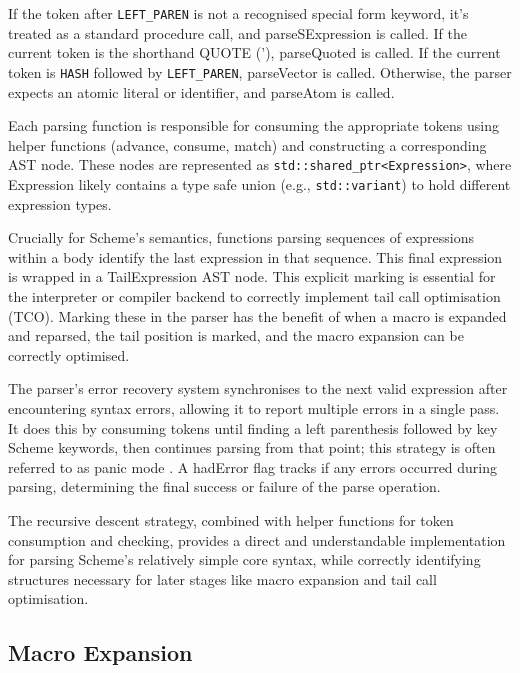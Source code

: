 \documentclass[final]{cmpreport_02}
\begin{document}
If the token after \texttt{LEFT\_PAREN} is not a recognised special form keyword, it's treated as a standard procedure call, and parseSExpression is called. If the current token is the shorthand QUOTE ('), parseQuoted is called. If the current token is \texttt{HASH} followed by \texttt{LEFT\_PAREN}, parseVector is called. Otherwise, the parser expects an atomic literal or identifier, and parseAtom is called.

Each parsing function is responsible for consuming the appropriate tokens using helper functions (advance, consume, match) and constructing a corresponding AST node. These nodes are represented as \texttt{std::shared\_ptr<Expression>}, where Expression likely contains a type safe union (e.g., \texttt{std::variant}) to hold different expression types.

Crucially for Scheme's semantics, functions parsing sequences of expressions within a body identify the last expression in that sequence. This final expression is wrapped in a TailExpression AST node. This explicit marking is essential for the interpreter or compiler backend to correctly implement tail call optimisation (TCO). Marking these in the parser has the benefit of when a macro is expanded and reparsed, the tail position is marked, and the macro expansion can be correctly optimised.

The parser's error recovery system synchronises to the next valid expression after encountering syntax errors, allowing it to report multiple errors in a single pass. It does this by consuming tokens until finding a left parenthesis followed by key Scheme keywords, then continues parsing from that point; this strategy is often referred to as panic mode \cite{nystrom2021crafting}. A hadError flag tracks if any errors occurred during parsing, determining the final success or failure of the parse operation.

The recursive descent strategy, combined with helper functions for token consumption and checking, provides a direct and understandable implementation for parsing Scheme's relatively simple core syntax, while correctly identifying structures necessary for later stages like macro expansion and tail call optimisation.

\subsection{Macro Expansion} %
\end{document}
